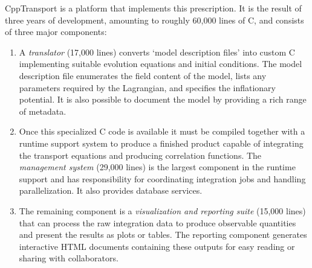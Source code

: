 \documentclass[11pt,a4paper]{article}
\newcommand{\packagefont}{\sffamily}
\newcommand{\CppTransport}{{\packagefont CppTransport}}
\newcommand\CC{C\nolinebreak\hspace{-.05em}\raisebox{.4ex}{\relsize{-3}{\textbf{+}}}\nolinebreak\hspace{-.10em}\raisebox{.4ex}{\relsize{-3}{\textbf{+}}}}
\begin{document}
{\CppTransport} is a platform that implements
this prescription.
It is the result of three years of development, amounting to roughly 60,000
lines of {\CC},
and consists of three major components:
\begin{enumerate}
    \item
    A \emph{translator} (17,000 lines)
    converts `model description files' into
    custom {\CC} implementing suitable evolution equations and
    initial conditions.
    The model description file enumerates the field content of the model,
    lists any parameters required by the Lagrangian, and
    specifies the inflationary potential.
    It is also possible to document the model by providing
    a rich range of metadata.
    
    \item
    Once this specialized {\CC} code is available it must be compiled
    together with a runtime support system to produce a finished product capable
    of integrating the transport equations and producing correlation
    functions.
    The \emph{management system} (29,000 lines) is the largest component
    in the runtime support
    and
    has responsibility for coordinating integration jobs
    and
    handling parallelization.
    It also provides database services.
    
    \item The remaining component is a \emph{visualization and reporting suite}
    (15,000 lines)
    that can process the raw integration data to produce observable
    quantities
    and present the results as plots or tables.
    The reporting component generates interactive HTML
    documents
    containing these outputs
    for easy reading or sharing with collaborators.
\end{enumerate}
\end{document}
